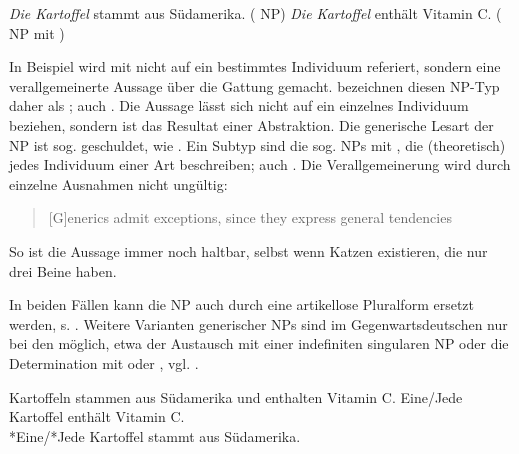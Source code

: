 \begin{exe}
	\ex \label{ex:gener}   
	\begin{xlist}
		\ex \label{ex:sued} \textit{Die Kartoffel} stammt aus Südamerika. ( NP)
		\ex \label{ex:vitc} \textit{Die Kartoffel} enthält Vitamin C. ( NP  mit )
		\end{xlist}
\end{exe}

In Beispiel  wird mit  nicht auf ein bestimmtes Individuum referiert, sondern eine verallgemeinerte Aussage über die Gattung  gemacht. \textcite[2]{Krifka1995} bezeichnen diesen NP-Typ daher als ; auch  \parencite[138]{Bisle-Muller1991}. Die Aussage lässt sich nicht auf ein einzelnes Individuum beziehen, sondern ist das Resultat einer Abstraktion. Die generische  Lesart der NP  ist sog.  geschuldet, wie  \parencite{Krifka1995}. Ein Subtyp sind die sog.  NPs mit , die (theoretisch) jedes Individuum einer Art beschreiben; auch   \parencite[139--140]{Bisle-Muller1991}. Die Verallgemeinerung wird durch einzelne Ausnahmen nicht ungültig: \blockcquote[179]{Lyons1999}{[G]enerics admit exceptions, since they express general tendencies}. So ist die Aussage   immer noch haltbar, selbst wenn Katzen existieren, die nur drei Beine haben.

In beiden Fällen kann die NP  auch durch eine artikellose Pluralform  ersetzt werden, s. . 
Weitere Varianten generischer  NPs  sind im Gegenwartsdeutschen nur bei den  möglich, etwa der Austausch mit einer indefiniten  singularen NP  oder die Determination mit  oder  \parencite[296]{Duden2009}, vgl. . 

\begin{exe}
	\ex \label{ex:gener3}   
	\begin{xlist}
		\ex \label{ex:sued2} Kartoffeln stammen aus Südamerika und enthalten Vitamin C. 
		\ex \label{ex:vitc2}  Eine/Jede Kartoffel enthält Vitamin C.\\
		*Eine/*Jede Kartoffel stammt aus Südamerika.
		\end{xlist}
\end{exe}

